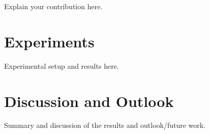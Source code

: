 \documentclass{article}
\begin{document}
Explain your contribution here.

\lipsum[14-16]
 \section{Experiments}\label{sec:experiments}

Experimental setup and results here.

\lipsum[16-18]
 \section{Discussion and Outlook}\label{sec:discussion}

Summary and discussion of the results and outlook/future work.

\lipsum[18-20]
 
\printbibliography
\end{document}
